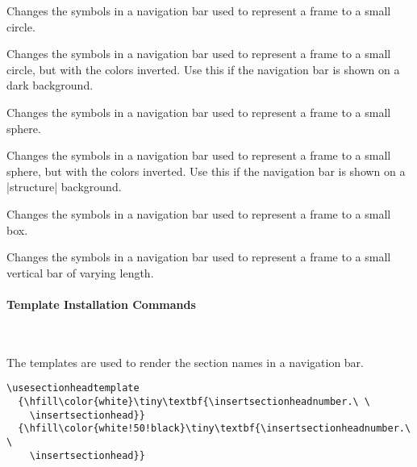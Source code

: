 \begin{command}{\beamertemplatecircleminiframe}
  Changes the symbols in a navigation bar used to represent
  a frame to a small circle.
\end{command}

\begin{command}{\beamertemplatecircleminiframeinverted}
  Changes the symbols in a navigation bar used to represent
  a frame to a small circle, but with the colors inverted. Use this if
  the navigation bar is shown on a dark background.
\end{command}

\begin{command}{\beamertemplatesphereminiframe}
  Changes the symbols in a navigation bar used to represent
  a frame to a small sphere.
\end{command}

\begin{command}{\beamertemplatesphereminiframeinverted}
  Changes the symbols in a navigation bar used to represent
  a frame to a small sphere, but with the colors inverted. Use this if
  the navigation bar is shown on a |structure| background.
\end{command}

\begin{command}{\beamertemplateboxminiframe}
  Changes the symbols in a navigation bar used to represent
  a frame to a small box.
\end{command}

\begin{command}{\beamertemplateticksminiframe}
  Changes the symbols in a navigation bar used to represent
  a frame to a small vertical bar of varying length.
\end{command}


\paragraph{Template Installation Commands}\ 

\begin{command}{\usesectionheadtemplate{}}
  The templates are used to render the section names in a navigation
  bar. 
  \example
\begin{verbatim}
\usesectionheadtemplate
  {\hfill\color{white}\tiny\textbf{\insertsectionheadnumber.\ \
    \insertsectionhead}}
  {\hfill\color{white!50!black}\tiny\textbf{\insertsectionheadnumber.\ \ 
    \insertsectionhead}}
\end{verbatim}
\end{command}
  

